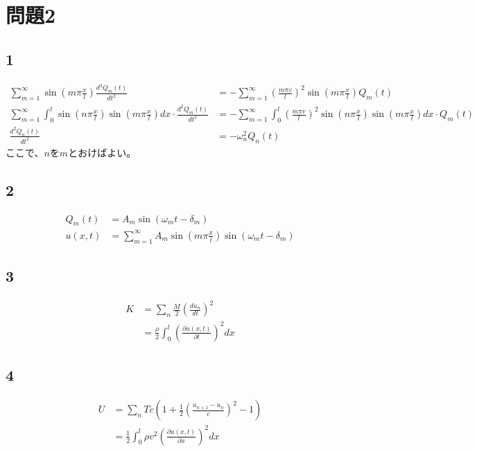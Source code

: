 \documentclass{jreport}
\begin{document}
\section{問題2}
\subsection{1}
\begin{equation}
	\begin{aligned}
		\sum_{m=1}^{\infty} \sin (m \pi \frac{x}{l} ) \frac{d^2 Q_m (t) }{dt^2} &= - \sum _{m=1}^{\infty} (\frac{m \pi v}{l})^2 \sin(m \pi \frac{x}{l})Q_m(t) \\
		\sum_{m=1}^{\infty} \int_0^l \sin(n \pi \frac{x}{l} ) \sin (m \pi \frac{x}{l} )dx \cdot \frac{d^2 Q_m (t) }{dt^2} &= - \sum _{m=1}^{\infty}\int_0^l (\frac{m \pi v}{l})^2 \sin(n \pi \frac{x}{l} )\sin(m \pi \frac{x}{l})dx\cdot Q_m(t) \\
		\frac{d^2 Q_n(t)}{dt^2} &=-\omega_n^2 Q_n(t)
	\end{aligned}
\end{equation}
	ここで、$n$を$m$とおけばよい。
\subsection{2}
\begin{equation}
	\begin{aligned}
		Q_m(t) &= A_m \sin(\omega_m t - \delta_m)\\
		u(x,t) &= \sum_{m=1}^{\infty} A_m \sin (m \pi \frac{x}{l} ) \sin(\omega_m t - \delta_m)
	\end{aligned}
\end{equation}
\subsection{3}
\begin{equation}
	\begin{aligned}
		K&=\sum_n \frac{M}{2}\left(\frac{du_n}{dt}\right)^2\\
		 &=\frac{\rho}{2} \int_0^l \left( \frac{\partial u(x,t)}{\partial t} \right) ^2dx
	\end{aligned}
\end{equation}
\subsection{4}
\begin{equation}
	\begin{aligned}
		U &= \sum_n Tc \left( 1 + \frac{1}{2} \left( \frac{u_{n+1} - u_n }{c} \right) ^2 -1 \right) \\
		  &= \frac{1}{2}\int_0^l \rho v^2 \left( \frac{\partial u(x,t) }{\partial x} \right)^2 dx
	\end{aligned}
\end{equation}
\end{document}
